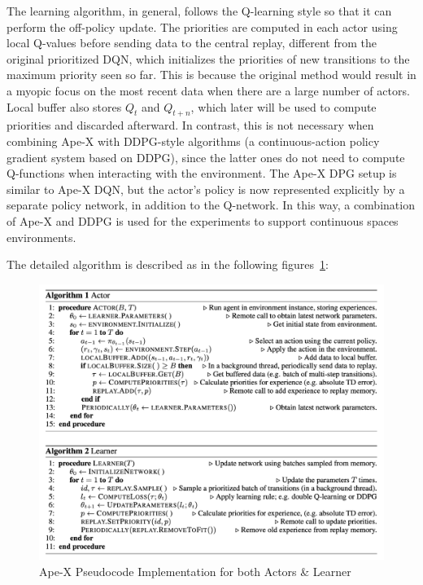 The learning algorithm, in general, follows the Q-learning style so that it can perform the off-policy update. 
The priorities are computed in each actor using local Q-values before sending data to the central replay, different from the original prioritized DQN, which initializes the priorities of new transitions to the maximum priority seen so far. This is because the original method would result in a myopic focus on the most recent data when there are a large number of actors. Local buffer also stores \(Q_{t}\) and \(Q_{t+n}\), which later will be used to compute priorities and discarded afterward. In contrast, this is not necessary when combining Ape-X with DDPG-style algorithms (a continuous-action policy gradient system based on DDPG), since the latter ones do not need to compute Q-functions when interacting with the environment. The Ape-X DPG setup is similar to Ape-X DQN, but the actor’s policy is now represented explicitly by a separate policy network, in addition to the Q-network.
In this way, a combination of Ape-X and DDPG is used for the experiments to support continuous spaces environments.

The detailed algorithm is described as in the following figures~\ref{fig:apex_algorithm}:
\begin{figure}[!htb]
		\centering
		\includegraphics[width=0.7\linewidth]{figures/apex.png}
		\caption{Ape-X Pseudocode Implementation for both Actors \& Learner}
		\label{fig:apex_algorithm}
\end{figure}